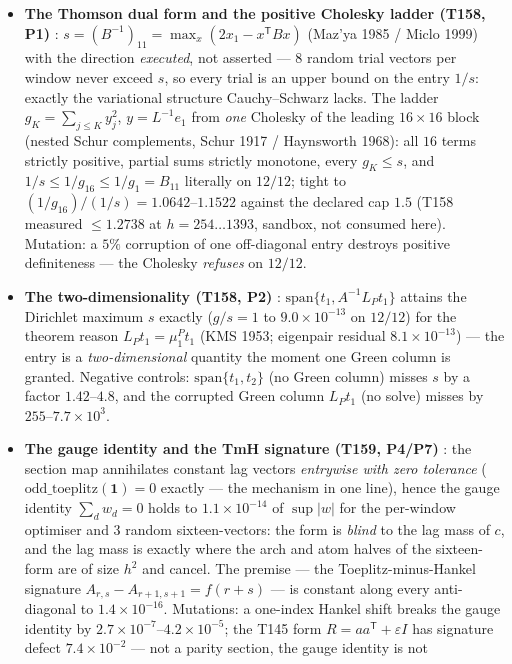 \documentclass[11pt,a4paper]{article}
\begin{document}
\begin{itemize}[leftmargin=1.5em]
\item \textbf{The Thomson dual form and the positive Cholesky ladder (T158, P1)} \mE:
$s=(B^{-1})_{11}=\max_x(2x_1-x^{\mathsf T}Bx)$ (Maz'ya 1985 / Miclo 1999) with the
direction \emph{executed}, not asserted --- $8$ random trial vectors per window never
exceed $s$, so every trial is an upper bound on the entry $1/s$: exactly the variational
structure Cauchy--Schwarz lacks. The ladder $g_K=\sum_{j\le K}y_j^2$, $y=L^{-1}e_1$ from
\emph{one} Cholesky of the leading $16\times16$ block (nested Schur complements, Schur
1917 / Haynsworth 1968): all $16$ terms strictly positive, partial sums strictly monotone,
every $g_K\le s$, and $1/s\le1/g_{16}\le1/g_1=B_{11}$ literally on $12/12$; tight to
$(1/g_{16})/(1/s)=1.0642$--$1.1522$ against the declared cap $1.5$ (T158 measured
$\le1.2738$ at $h=254\ldots1393$, sandbox, not consumed here). Mutation: a $5\%$
corruption of one off-diagonal entry destroys positive definiteness --- the Cholesky
\emph{refuses} on $12/12$.
\item \textbf{The two-dimensionality (T158, P2)} \mE:
$\mathrm{span}\{t_1,A^{-1}L_Pt_1\}$ attains the Dirichlet maximum $s$ exactly ($g/s=1$ to
$9.0\times10^{-13}$ on $12/12$) for the theorem reason $L_Pt_1=\mu^P_1t_1$ (KMS 1953;
eigenpair residual $8.1\times10^{-13}$) --- the entry is a \emph{two-dimensional} quantity
the moment one Green column is granted. Negative controls: $\mathrm{span}\{t_1,t_2\}$ (no
Green column) misses $s$ by a factor $1.42$--$4.8$, and the corrupted Green column
$L_Pt_1$ (no solve) misses by $255$--$7.7\times10^{3}$.
\item \textbf{The gauge identity and the TmH signature (T159, P4/P7)} \mE: the section map
annihilates constant lag vectors \emph{entrywise with zero tolerance}
($\mathrm{odd\_toeplitz}(\mathbf 1)=0$ exactly --- the mechanism in one line), hence the
gauge identity $\sum_d w_d=0$ holds to $1.1\times10^{-14}$ of $\sup|w|$ for the per-window
optimiser and $3$ random sixteen-vectors: the form is \emph{blind} to the lag mass of $c$,
and the lag mass is exactly where the arch and atom halves of the sixteen-form are of size
$h^2$ and cancel. The premise --- the Toeplitz-minus-Hankel signature
$A_{r,s}-A_{r+1,s+1}=f(r+s)$ --- is constant along every anti-diagonal to
$1.4\times10^{-16}$. Mutations: a one-index Hankel shift breaks the gauge identity by
$2.7\times10^{-7}$--$4.2\times10^{-5}$; the T145 form $R=aa^{\mathsf T}+\varepsilon I$ has
signature defect $7.4\times10^{-2}$ --- not a parity section, the gauge identity is not

\end{itemize}
\end{document}
